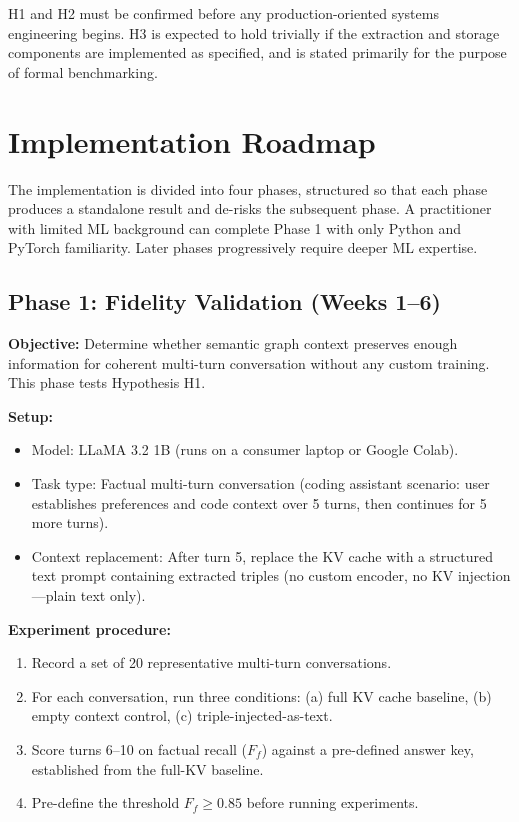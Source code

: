 \documentclass[11pt, a4paper, twoside]{article}
\theoremstyle{definition}
\begin{document}
H1 and H2 must be confirmed before any production-oriented systems engineering begins.
H3 is expected to hold trivially if the extraction and storage components are
implemented as specified, and is stated primarily for the purpose of formal
benchmarking.

\section{Implementation Roadmap}
\label{sec:roadmap}

The implementation is divided into four phases, structured so that each phase
produces a standalone result and de-risks the subsequent phase. A practitioner
with limited ML background can complete Phase 1 with only Python and PyTorch
familiarity. Later phases progressively require deeper ML expertise.

\subsection{Phase 1: Fidelity Validation (Weeks 1--6)}
\label{sec:phase1}

\textbf{Objective:} Determine whether semantic graph context preserves enough
information for coherent multi-turn conversation without any custom training.
This phase tests Hypothesis H1.

\medskip

\textbf{Setup:}
\begin{itemize}[leftmargin=*]
  \item Model: LLaMA 3.2 1B (runs on a consumer laptop or Google Colab).
  \item Task type: Factual multi-turn conversation (coding assistant scenario:
    user establishes preferences and code context over 5 turns, then continues
    for 5 more turns).
  \item Context replacement: After turn 5, replace the KV cache with a
    structured text prompt containing extracted triples (no custom encoder,
    no KV injection---plain text only).
\end{itemize}

\textbf{Experiment procedure:}
\begin{enumerate}[leftmargin=*]
  \item Record a set of 20 representative multi-turn conversations.
  \item For each conversation, run three conditions: (a) full KV cache
    baseline, (b) empty context control, (c) triple-injected-as-text.
  \item Score turns 6--10 on factual recall ($F_f$) against a pre-defined
    answer key, established from the full-KV baseline.
  \item Pre-define the threshold $F_f \geq 0.85$ before running experiments.
\end{enumerate}
\end{document}
